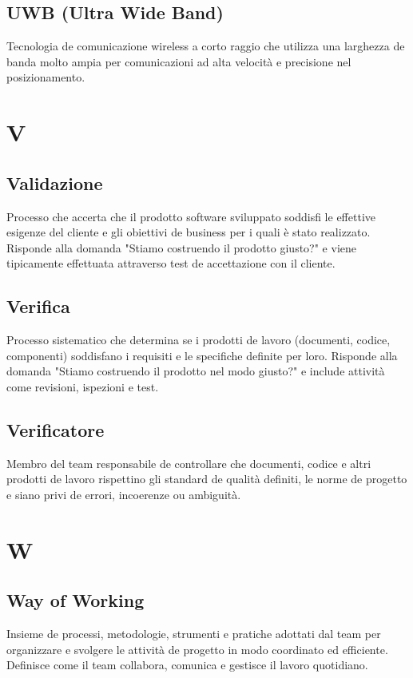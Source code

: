 \documentclass[a4paper,11pt]{article}
\begin{document}
\subsection{UWB (Ultra Wide Band)}
Tecnologia de comunicazione wireless a corto raggio che utilizza una larghezza de banda molto ampia per comunicazioni ad alta velocità e precisione nel posizionamento.

\newpage
\section{V}

\subsection{Validazione}
Processo che accerta che il prodotto software sviluppato soddisfi le effettive esigenze del cliente e gli obiettivi de business per i quali è stato realizzato. Risponde alla domanda "Stiamo costruendo il prodotto giusto?" e viene tipicamente effettuata attraverso test de accettazione con il cliente.

\subsection{Verifica}
Processo sistematico che determina se i prodotti de lavoro (documenti, codice, componenti) soddisfano i requisiti e le specifiche definite per loro. Risponde alla domanda "Stiamo costruendo il prodotto nel modo giusto?" e include attività come revisioni, ispezioni e test.

\subsection{Verificatore}
Membro del team responsabile de controllare che documenti, codice e altri prodotti de lavoro rispettino gli standard de qualità definiti, le norme de progetto e siano privi de errori, incoerenze ou ambiguità.

\newpage
\section{W}

\subsection{Way of Working}
Insieme de processi, metodologie, strumenti e pratiche adottati dal team per organizzare e svolgere le attività de progetto in modo coordinato ed efficiente. Definisce come il team collabora, comunica e gestisce il lavoro quotidiano.
\end{document}
